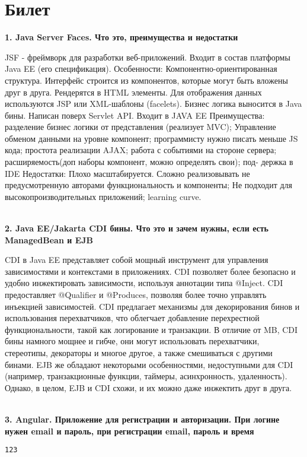 \documentclass{article}
\newcommand{\bil}[5]{%
        \section{Билет}
        \textbf{1. #1}

        #4
        \\
        \textbf{2. #2}
        
        #5
        \\
        \textbf{3. #3}
}
\begin{document}
\bil{Java Server Faces. Что это, преимущества и недостатки}
{Java EE/Jakarta CDI бины. Что это и зачем нужны, если есть ManagedBean и EJB}
{Angular. Приложение для регистрации и авторизации. При логине нужен email и пароль, при регистрации email, пароль и время}{
    JSF - фреймворк для разработки веб-приложений. Входит в состав платформы Java EE (его спецификация). 
    Особенности: Компонентно-ориентированная структура. 
    Интерфейс строится из компонентов, которые могут быть вложены друг в друга. 
    Рендерятся в HTML элементы. Для отображения данных используются JSP или XML-шаблоны (facelets). 
    Бизнес логика выносится в Java бины. Написан поверх Servlet API. 
    Входит в JAVA EE Преимущества: разделение бизнес логики от представления (реализует MVC); Управление обменом данными на уровне компонент; программисту нужно писать меньше JS кода; простота реализации AJAX; работа с событиями на стороне сервера; расширяемость(доп наборы компонент, можно определять свои); под- держка в IDE Недостатки: Плохо масштабируется. 
    Сложно реализовывать не предусмотренную авторами функциональность и компоненты; Не подходит для высокопроизводительных приложений; learning curve.
}{
    CDI в Java EE представляет собой мощный инструмент для управления зависимостями и контекстами в приложениях. 
    CDI позволяет более безопасно и удобно инжектировать зависимости, используя аннотации типа @Inject.
    CDI предоставляет @Qualifier и @Produces, позволяя более точно управлять инъекцией зависимостей.
    CDI предлагает механизмы для декорирования бинов и использования перехватчиков, что облегчает добавление перехрестной функциональности, такой как логирование и транзакции.
    В отличие от MB, CDI бины намного мощнее и гибче, они могут использовать перехватчики, стереотипы, декораторы и многое другое, а также смешиваться с другими бинами. EJB же обладают некоторыми особенностями, недоступными для CDI (например, транзакционные функции, таймеры, асинхронность, удаленность). Однако, в целом, EJB и CDI схожи, и их можно даже инжектить друг в друга.
}
\begin{lstlisting}[frame=single, basicstyle=\ttfamily, breaklines=true, breakatwhitespace=true, postbreak=\mbox{\textcolor{red}{$\hookrightarrow$}\space}]
123
\end{lstlisting}
\end{document}
